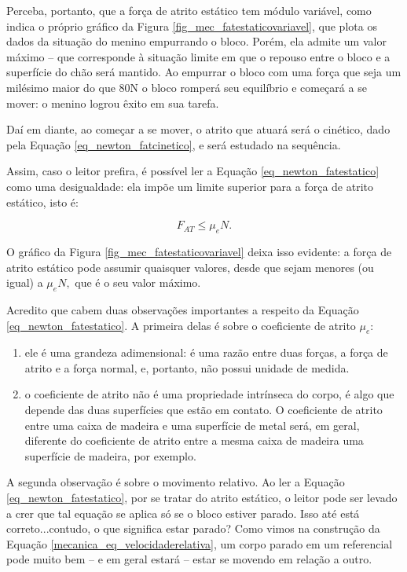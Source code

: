 Perceba, portanto, que a força de atrito estático tem módulo variável, como indica o próprio gráfico da Figura \ref{fig_mec_fatestaticovariavel}, que plota os dados da situação do menino empurrando o bloco. Porém, ela admite um valor máximo -- que corresponde à situação limite em que o repouso entre o bloco e a superfície do chão será mantido. Ao empurrar o bloco com uma força que seja um milésimo maior do que $80$N o bloco romperá seu equilíbrio e começará a se mover: o menino logrou êxito em sua tarefa. 

Daí em diante, ao começar a se mover, o atrito que atuará será o cinético, dado pela Equação \eqref{eq_newton_fatcinetico}, e será estudado na sequência.

Assim, caso o leitor prefira, é possível ler a Equação \eqref{eq_newton_fatestatico} como uma desigualdade: ela impõe um limite superior para a força de atrito estático, isto é:

$$ F_{AT} \leq \mu_{e} N. $$

O gráfico da Figura \ref{fig_mec_fatestaticovariavel} deixa isso evidente: a força de atrito estático pode assumir quaisquer valores, desde que sejam menores (ou igual) a $\mu_e N,$ que é o seu valor máximo.


Acredito que cabem duas observações importantes a respeito da Equação \eqref{eq_newton_fatestatico}. A primeira delas é sobre o coeficiente de atrito $\mu_e$:

\begin{enumerate}
    \item ele é uma grandeza adimensional: é uma razão entre duas forças, a força de atrito e a força normal, e, portanto, não possui unidade de medida.

    \item  o coeficiente de atrito não é uma propriedade intrínseca do corpo, é algo que depende das duas superfícies que estão em contato. O coeficiente de atrito entre uma caixa de madeira e uma superfície de metal será, em geral, diferente do coeficiente de atrito entre a mesma caixa de madeira uma superfície de madeira, por exemplo.
\end{enumerate}


A segunda observação é sobre o movimento relativo. Ao ler a Equação \eqref{eq_newton_fatestatico}, por se tratar do atrito estático, o leitor pode ser levado a crer que tal equação se aplica só se o bloco estiver parado. Isso até está correto...contudo, o que significa estar parado? Como vimos na construção da Equação \eqref{mecanica_eq_velocidaderelativa}, um corpo parado em um referencial pode muito bem -- e em geral estará -- estar se movendo em relação a outro.

